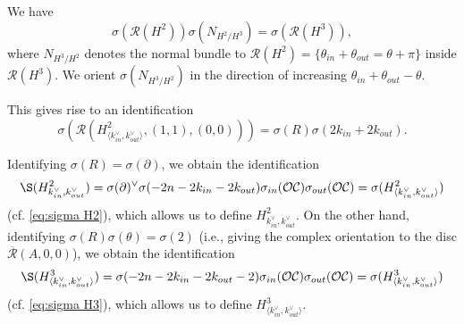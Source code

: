 \documentclass{article}
\def\cO{\mathcal{O}}
\def\cC{\mathcal{C}}
\def\cR{\mathcal{R}}
\def\Rbar{\overline{\mathcal{R}}}
\begin{document}
We have
$$\sigma(\cR(H^2))\sigma(N_{H^2/H^3})=\sigma(\cR(H^3)),$$
where $N_{H^3/H^2}$ denotes the normal bundle to $\cR(H^2) = \{\theta_{in}+\theta_{out} = \theta+\pi\}$ inside $\cR(H^3)$. 
We orient $\sigma(N_{H^3/H^2})$ in the direction of increasing $\theta_{in} + \theta_{out} - \theta$. 

This gives rise to an identification 
$$\sigma(\cR(H^2_{\langle k_{in}^\vee,k_{out}^\vee\rangle},(1,1),(0,0))) = \sigma(R)\sigma(2k_{in}+2k_{out}).$$

Identifying $\sigma(R) = \sigma(\partial)$, we obtain the identification
$$\S(H^2_{k_{in}^\vee,k_{out}^\vee}) = \sigma(\partial)^\vee \sigma(-2n-2k_{in}-2k_{out}) \sigma_{in}(\cO\cC)\sigma_{out}(\cO\cC) = \sigma(H^2_{\langle k_{in}^\vee,k_{out}^\vee\rangle})$$
(cf. \eqref{eq:sigma H2}), which allows us to define $H^2_{k_{in}^\vee,k_{out}^\vee}$. 
On the other hand, identifying $\sigma(R)\sigma(\theta) = \sigma(2)$ (i.e., giving the complex orientation to the disc $\Rbar(A,0,0)$), we obtain the identification
$$\S(H^3_{\langle k_{in}^\vee,k_{out}^\vee\rangle}) = \sigma(-2n-2k_{in}-2k_{out}-2)\sigma_{in}(\cO\cC)\sigma_{out}(\cO\cC) = \sigma(H^3_{\langle k_{in}^\vee,k_{out}^\vee\rangle})$$
(cf. \eqref{eq:sigma H3}), which allows us to define $H^3_{\langle k_{in}^\vee,k_{out}^\vee\rangle}$.
\end{document}
